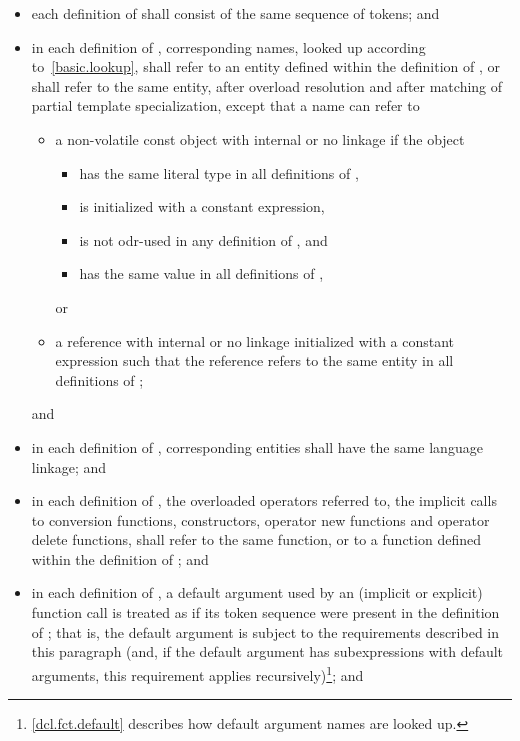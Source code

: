 \begin{itemize}
\item each definition of  shall consist of the same sequence of
tokens; and
\item in each definition of , corresponding names, looked up
according to~\ref{basic.lookup}, shall refer to an entity defined within
the definition of , or shall refer to the same entity, after
overload resolution and after matching of partial
template specialization, except that a name can refer to
\begin{itemize}
\item
a non-volatile const object with internal or no linkage if the object
\begin{itemize}
\item has the same literal type in all definitions of ,
\item is initialized with a constant expression,
\item is not odr-used in any definition of , and
\item has the same value in all definitions of ,
\end{itemize}
or
\item
a reference with internal or no linkage
initialized with a constant expression such that
the reference refers to the same entity in all definitions of ;
\end{itemize}
and

\item in each definition of , corresponding entities shall have the
same language linkage; and

\item in each definition of , the overloaded operators referred
to, the implicit calls to conversion functions, constructors, operator
new functions and operator delete functions, shall refer to the same
function, or to a function defined within the definition of ;
and

\item in each definition of , a default argument used by an
(implicit or explicit) function call is treated as if its token sequence
were present in the definition of ; that is, the default
argument is subject to the requirements described in this paragraph (and, if
the default argument has subexpressions with default arguments, this
requirement applies recursively)\footnote{\ref{dcl.fct.default}
describes how default argument names are looked up.}; and


\end{itemize}
